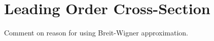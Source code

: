 \documentclass[../main.tex]{subfiles}
\begin{document}






\section{Leading Order Cross-Section}

\begin{TODO}
  \item Comment on reason for using Breit-Wigner approximation.
\end{TODO}
\end{document}
